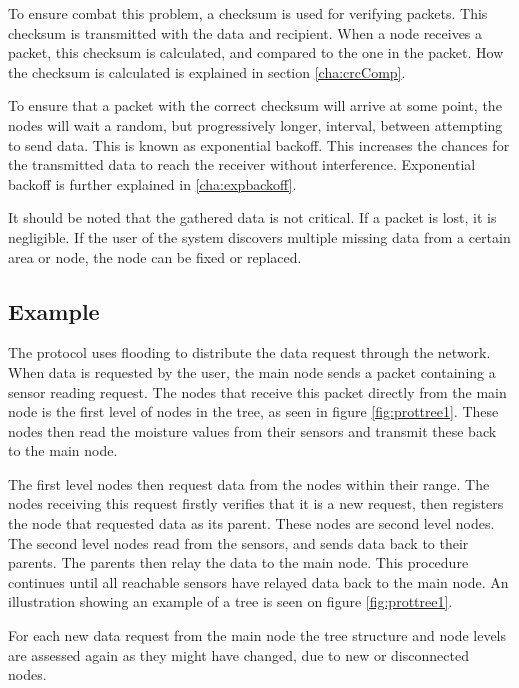 To ensure combat this problem, a checksum is used for verifying packets. This checksum is transmitted with the data and recipient. When a node receives a packet, this checksum is calculated, and compared to the one in the packet. How the checksum is calculated is explained in section \ref{cha:crcComp}.

To ensure that a packet with the correct checksum will arrive at some point, the nodes will wait a random, but progressively longer, interval, between attempting to send data. This is known as exponential backoff. This increases the chances for the transmitted data to reach the receiver without interference. Exponential backoff is further explained in \ref{cha:expbackoff}.

It should be noted that the gathered data is not critical. If a packet is lost, it is negligible. If the user of the system discovers multiple missing data from a certain area or node, the node can be fixed or replaced.


\subsection*{Example}
The protocol uses flooding to distribute the data request through the network. 
When data is requested by the user, the main node sends a packet containing a sensor reading request. 
The nodes that receive this packet directly from the main node is the first level of nodes in the tree, as seen in figure \ref{fig:prottree1}. 
These nodes then read the moisture values from their sensors and transmit these back to the main node. 

The first level nodes then request data from the nodes within their range. 
The nodes receiving this request firstly verifies that it is a new request, then registers the node that requested data as its parent. 
These nodes are second level nodes. The second level nodes read from the sensors, and sends data back to their parents. The parents then relay the data to the main node. 
This procedure continues until all reachable sensors have relayed data back to the main node.
An illustration showing an example of a tree is seen on figure \ref{fig:prottree1}.

For each new data request from the main node the tree structure and node levels are assessed again as they might have changed, due to new or disconnected nodes.

